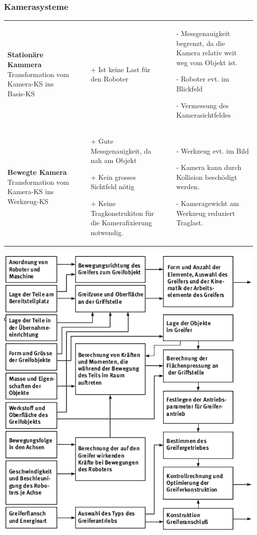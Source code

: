  \subsubsection{Kamerasysteme}
 \begin{tabular}{p{5cm}p{6cm}p{6cm}}
    \textbf{Stationäre Kammera}\newline
    Transformation vom Kamera-KS ins Basis-KS&
    \begin{itemize}
        \item[+] Ist keine Last für den Roboter
    \end{itemize}
    &
        \begin{itemize}
        \item[-] Messgenauigkeit begrenzt, da die Kamera relativ weit weg vom Objekt ist.
        \item[-] Roboter evt. im Blickfeld
        \item[-] Vermessung des Kamerasichtfeldes
    \end{itemize}\\
    \textbf{Bewegte Kamera}\newline
    Transformation vom Kamera-KS ins Werkzeug-KS&
    \begin{itemize}
        \item[+] Gute Messgenauigkeit, da nah am Objekt
        \item[+] Kein grosses Sichtfeld nötig
        \item[+] Keine Tragkonstrukiton für die Kamerafixierung notwendig.
    \end{itemize}&
    \begin{itemize}
        \item[-] Werkzeug evt. im Bild
        \item[-] Kamera kann durch Kollision beschödigt werden.
        \item[-] Kameragewicht am Werkzeug reduziert Traglast.
    \end{itemize}\\
 \end{tabular}

 \includegraphics[width=0.7\linewidth]{./bilder/GreiferProject}